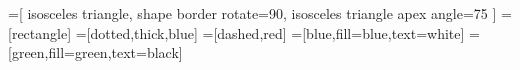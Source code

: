 \usepackage{tikz}
\usepackage{pgfplots}               %

\pgfplotsset{compat=1.18}          %
\usetikzlibrary{pgfplots.dateplot}  %

\usetikzlibrary{shapes,arrows.meta}
\usetikzlibrary{graphs}            %
\usetikzlibrary{quotes}            %
\usetikzlibrary{positioning}       %

\tikzset{>=stealth}

=[
  isosceles triangle,
  shape border rotate=90,
  isosceles triangle apex angle=75
]
=[rectangle] %
=[dotted,thick,blue]
=[dashed,red]
=[blue,fill=blue,text=white]
=[green,fill=green,text=black]
